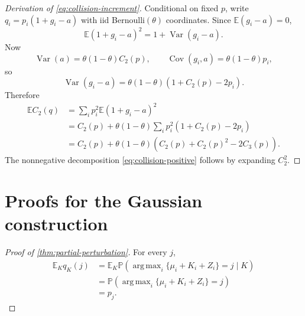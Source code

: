 \documentclass[11pt]{article}
\theoremstyle{definition}
\theoremstyle{remark}
\DeclareMathOperator{\Var}{Var}
\DeclareMathOperator{\Cov}{Cov}
\DeclareMathOperator*{\argmax}{arg\,max}
\newcommand{\E}{\mathbb{E}}
\newcommand{\Pp}{\mathbb{P}}
\begin{document}
\begin{proof}[Derivation of \eqref{eq:collision-increment}]
Conditional on fixed $p$, write $q_i=p_i(1+g_i-a)$ with iid Bernoulli$(\theta)$ coordinates. Since $\E(g_i-a)=0$,
\begin{equation}
\E(1+g_i-a)^2=1+\Var(g_i-a).
\end{equation}
Now
\begin{equation}
\Var(a)=\theta(1-\theta)C_2(p),
\qquad
\Cov(g_i,a)=\theta(1-\theta)p_i,
\end{equation}
so
\begin{equation}
\Var(g_i-a)
=\theta(1-\theta)\left(1+C_2(p)-2p_i\right).
\end{equation}
Therefore
\begin{align}
\E C_2(q)
&=\sum_i p_i^2\E(1+g_i-a)^2\\
&=C_2(p)+\theta(1-\theta)
\sum_i p_i^2\left(1+C_2(p)-2p_i\right)\\
&=C_2(p)+\theta(1-\theta)
\left(C_2(p)+C_2(p)^2-2C_3(p)\right).
\end{align}
The nonnegative decomposition \eqref{eq:collision-positive} follows by expanding $C_2^2$.
\end{proof}

\section{Proofs for the Gaussian construction}
\label{app:gaussian-proofs}

\begin{proof}[Proof of \cref{thm:partial-perturbation}]
For every $j$,
\begin{align}
\E_K q_K(j)
&=\E_K\Pp\!\left(\argmax_i\{\mu_i+K_i+Z_i\}=j\mid K\right)\\
&=\Pp\!\left(\argmax_i\{\mu_i+K_i+Z_i\}=j\right)\\
&=p_j.
\end{align}
\end{proof}
\end{document}

